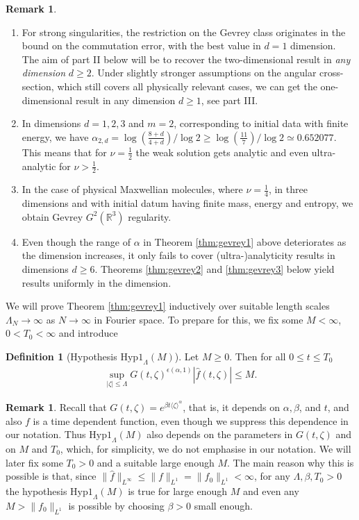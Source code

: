 \documentclass[11pt,a4paper,reqno]{amsart}
\theoremstyle{plain}
\theoremstyle{definition}
\newtheorem{definition}[proposition]{Definition}
\newtheorem{remark}[proposition]{Remark}
\begin{document}
\begin{remark}
	\begin{enumerate}[label=(\roman*)]
		\item For strong singularities, the restriction on the Gevrey class originates in the bound on the commutation error, with the best value in $d=1$ dimension. The aim of part II below will be to recover the two-dimensional result in \emph{any dimension} $d\geq 2$. Under slightly stronger assumptions on the angular cross-section, which still covers all physically relevant cases, we can get the one-dimensional result in any dimension $d\geq 1$, see part III.
		\item In dimensions $d=1, 2, 3$ and $m=2$, corresponding to initial data with finite energy, we have $\alpha_{2,d} = \log\left(\frac{8+d}{4+d}\right)/\log 2 \geq \log\left(\frac{11}{7}\right)/\log 2 \simeq 0.652077$. This means that for $\nu=\frac{1}{2}$ the weak solution gets analytic and even ultra-analytic for $\nu>\frac{1}{2}$.
		\item In the case of physical Maxwellian molecules, where $\nu=\frac{1}{4}$, in three dimensions and with initial datum having finite mass, energy and entropy, we obtain Gevrey $G^{2}({\mathbb{R}}^3)$ regularity.
		\item Even though the range of $\alpha$ in Theorem \ref{thm:gevrey1} above  deteriorates as the dimension increases, it only fails to cover (ultra-)analyticity results in dimensions $d\geq 6$. Theorems \ref{thm:gevrey2} and \ref{thm:gevrey3} below yield results uniformly in the dimension.
	\end{enumerate}
\end{remark}

We will prove Theorem \ref{thm:gevrey1} inductively over suitable length scales $\Lambda_N\to\infty$ as $N\to\infty$ in Fourier space.
To prepare for this, we fix some $M<\infty$, $0<T_0<\infty$ and introduce

\begin{definition}[Hypothesis $\mathrm{Hyp1}_{\Lambda}(M)$] \label{def:Hyp_Lambda}
    Let $M\geq 0$. Then  for all $0\le t\le T_0$
    \begin{align}\label{eq:Hyp_Lambda}
    	\sup_{|\zeta|\leq \Lambda} G(t, \zeta)^{\epsilon(\alpha,1)} |\hat{f}(t,\zeta)| \leq M.
    \end{align}
\end{definition}
\begin{remark}
    Recall that $G(t,\zeta)= e^{\beta t \langle\zeta\rangle^{\alpha}}$, that is, it depends on $\alpha, \beta$, and $t$, and also $f$ is a time dependent function,
    even though we suppress this dependence in our notation.
     Thus $\mathrm{Hyp1}_{\Lambda}(M)$ also depends on the parameters in $G(t,\zeta)$ and on $M$ and $T_0$, which, for simplicity, we do not emphasise in our notation.
     We will later fix some $T_0>0$ and a suitable large enough $M$.
     The main reason why this is possible is that, since $\|\hat f\|_{L^\infty} \le \|f\|_{L^1} = \|f_0\|_{L^1}<\infty$,
    for any $\Lambda, \beta, T_0>0$ the hypothesis $\mathrm{Hyp1}_{\Lambda}(M)$ is true for large enough $M$ and even any $M> \|f_0\|_{L^1}$ is possible by choosing
    $\beta>0$ small enough.
\end{remark}
\end{document}

